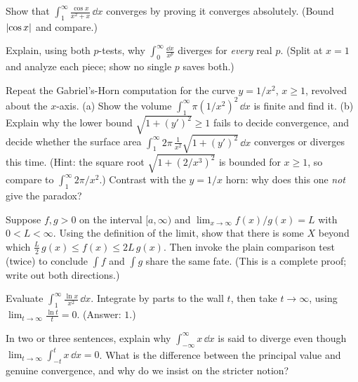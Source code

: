\begin{exercise}
\label{ch25:exr-absolute}
Show that $\displaystyle\int_1^{\infty}\frac{\cos x}{x^2 + x}\,\dd x$ converges by
proving it converges absolutely. (Bound $\lvert\cos x\rvert$ and compare.)
\end{exercise}

\begin{exercise}
\label{ch25:exr-both-ends}
Explain, using both $p$-tests, why $\displaystyle\int_0^{\infty}\frac{\dd x}{x^p}$
diverges for \emph{every} real $p$. (Split at $x=1$ and analyze each piece; show no
single $p$ saves both.)
\end{exercise}

\begin{exercise}
\label{ch25:exr-horn}
Repeat the Gabriel's-Horn computation for the curve $y = 1/x^2$, $x\ge 1$, revolved
about the $x$-axis.
(a) Show the volume $\int_1^\infty \pi (1/x^2)^2\,\dd x$ is finite and find it.
(b) Explain why the lower bound $\sqrt{1+(y')^2}\ge 1$ fails to decide convergence, and decide whether the surface area
$\int_1^\infty 2\pi\,\frac{1}{x^2}\sqrt{1+(y')^2}\,\dd x$ converges or diverges this
time. (Hint: the square root $\sqrt{1+(2/x^3)^2}$ is bounded for $x\ge 1$, so
compare to $\int_1^\infty 2\pi/x^2$.) Contrast with the $y=1/x$ horn: why does this
one \emph{not} give the paradox?
\end{exercise}

\begin{exercise}
\label{ch25:exr-prove-lct}
Suppose $f,g>0$ on the interval $[a,\infty)$ and $\lim_{x\to\infty} f(x)/g(x) = L$ with
$0<L<\infty$. Using the definition of the limit, show that there is some $X$ beyond
which $\frac{L}{2}\,g(x) \le f(x) \le 2L\,g(x)$. Then invoke the plain comparison
test (twice) to conclude $\int f$ and $\int g$ share the same fate. (This is a
complete proof; write out both directions.)
\end{exercise}

\begin{exercise}
\label{ch25:exr-lhopital}
Evaluate $\displaystyle\int_1^{\infty}\frac{\ln x}{x^2}\,\dd x$. Integrate by parts
to the wall $t$, then take $t\to\infty$, using $\lim_{t\to\infty}\frac{\ln t}{t}=0$.
(Answer: $1$.)
\end{exercise}

\begin{exercise}
\label{ch25:exr-why-split}
In two or three sentences, explain why $\int_{-\infty}^{\infty} x\,\dd x$ is said to
diverge even though $\lim_{t\to\infty}\int_{-t}^{t} x\,\dd x = 0$. What is the
difference between the principal value and genuine convergence, and why do we
insist on the stricter notion?
\end{exercise}

